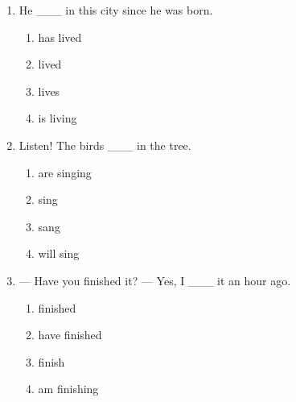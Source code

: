 \documentclass[11pt,a4paper]{ctexart}
\begin{document}
\begin{enumerate}[leftmargin=*,itemsep=4pt]
\begin{enumerate}[label=\Alph*.,leftmargin=2em,itemsep=1pt,topsep=2pt]
\item cooks
\item is cooking
\end{enumerate}
\item He \_\_\_ in this city since he was born.
\begin{enumerate}[label=\Alph*.,leftmargin=2em,itemsep=1pt,topsep=2pt]
\item has lived
\item lived
\item lives
\item is living
\end{enumerate}
\item Listen! The birds \_\_\_ in the tree.
\begin{enumerate}[label=\Alph*.,leftmargin=2em,itemsep=1pt,topsep=2pt]
\item are singing
\item sing
\item sang
\item will sing
\end{enumerate}
\item — Have you finished it? — Yes, I \_\_\_ it an hour ago.
\begin{enumerate}[label=\Alph*.,leftmargin=2em,itemsep=1pt,topsep=2pt]
\item finished
\item have finished
\item finish
\item am finishing
\end{enumerate}
\end{enumerate}
\end{document}
